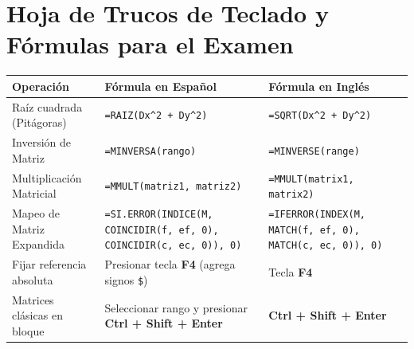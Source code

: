 \documentclass[10pt,a4paper]{article}
\begin{document}
\newpage

\section{Hoja de Trucos de Teclado y Fórmulas para el Examen}

\begin{center}
\small
\begin{tabularx}{\textwidth}{l X X}
\toprule
\textbf{Operación} & \textbf{Fórmula en Español} & \textbf{Fórmula en Inglés} \\
\midrule
Raíz cuadrada (Pitágoras) & \texttt{=RAIZ(Dx\textasciicircum 2 + Dy\textasciicircum 2)} & \texttt{=SQRT(Dx\textasciicircum 2 + Dy\textasciicircum 2)} \\
Inversión de Matriz & \texttt{=MINVERSA(rango)} & \texttt{=MINVERSE(range)} \\
Multiplicación Matricial & \texttt{=MMULT(matriz1, matriz2)} & \texttt{=MMULT(matrix1, matrix2)} \\
Mapeo de Matriz Expandida & \texttt{=SI.ERROR(INDICE(M, COINCIDIR(f, ef, 0), COINCIDIR(c, ec, 0)), 0)} & \texttt{=IFERROR(INDEX(M, MATCH(f, ef, 0), MATCH(c, ec, 0)), 0)} \\
Fijar referencia absoluta & Presionar tecla \textbf{F4} (agrega signos \texttt{\$}) & Tecla \textbf{F4} \\
Matrices clásicas en bloque & Seleccionar rango y presionar \textbf{Ctrl + Shift + Enter} & \textbf{Ctrl + Shift + Enter} \\
\bottomrule
\end{tabularx}
\end{center}
\end{document}

